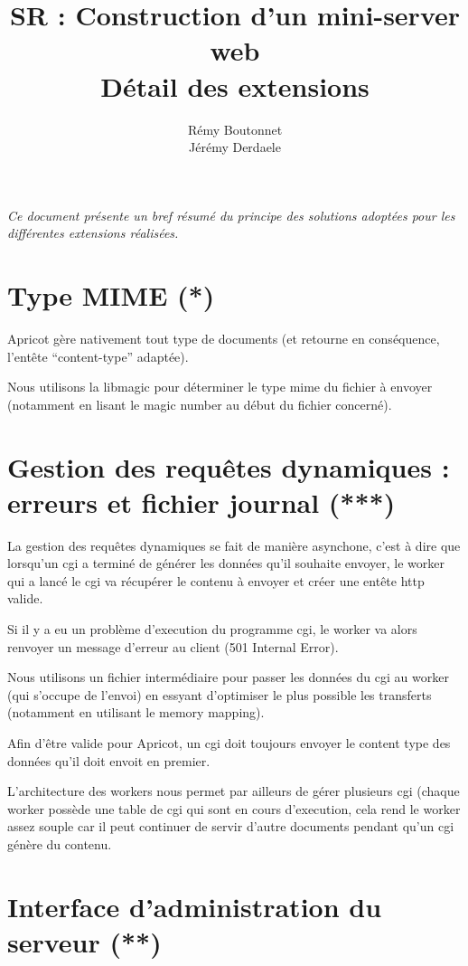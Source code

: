 \documentclass{article}
\title{SR : Construction d'un mini-server web\\Détail des extensions}
\author{Rémy Boutonnet\\Jérémy Derdaele}
\begin{document}
\maketitle


\textit{
Ce document présente un bref résumé du principe des solutions adoptées pour les différentes extensions réalisées.
}

\section{Type MIME (*)}
Apricot gère nativement tout type de documents (et retourne en conséquence, l'entête ``content-type'' adaptée).

Nous utilisons la libmagic pour déterminer le type mime du fichier à envoyer (notamment en lisant le magic number au début du fichier concerné).


\section{Gestion des requêtes dynamiques : erreurs et fichier journal (***)}

La gestion des requêtes dynamiques se fait de manière asynchone, c'est à dire que lorsqu'un cgi a terminé de générer les données qu'il souhaite envoyer, le worker qui a lancé le cgi va récupérer le contenu à envoyer et créer une entête http valide.

Si il y a eu un problème d'execution du programme cgi, le worker va alors renvoyer un message d'erreur au client (501 Internal Error).

Nous utilisons un fichier intermédiaire pour passer les données du cgi au worker (qui s'occupe de l'envoi) en essyant d'optimiser le plus possible les transferts (notamment en utilisant le memory mapping).

Afin d'être valide pour Apricot, un cgi doit toujours envoyer le content type des données qu'il doit envoit en premier.

L'architecture des workers nous permet par ailleurs de gérer plusieurs cgi (chaque worker possède une table de cgi qui sont en cours d'execution,
cela rend le worker assez souple car il peut continuer de servir d'autre documents pendant qu'un cgi génère du contenu.

\section{Interface d'administration du serveur (**)}
\end{document}
